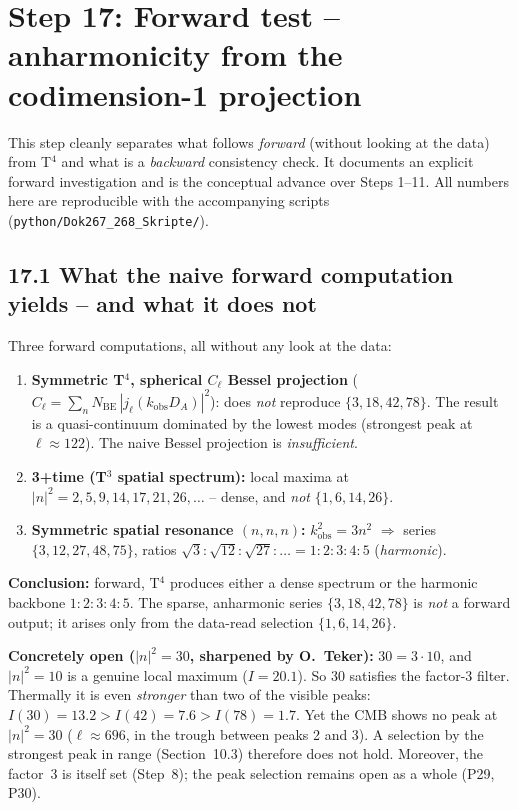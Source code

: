 \section{Step 17: Forward test -- anharmonicity from the codimension-1 projection}

This step cleanly separates what follows \emph{forward} (without looking at
the data) from T$^4$ and what is a \emph{backward} consistency check. It
documents an explicit forward investigation and is the conceptual advance over
Steps 1--11. All numbers here are reproducible with the accompanying scripts
(\texttt{python/Dok267\_268\_Skripte/}).

\subsection*{17.1 What the naive forward computation yields -- and what it does not}

Three forward computations, all without any look at the data:

\begin{enumerate}
  \item \textbf{Symmetric T$^4$, spherical $C_\ell$ Bessel projection}
        ($C_\ell = \sum_n N_\mathrm{BE}\,|j_\ell(k_\mathrm{obs}D_A)|^2$):
        does \emph{not} reproduce $\{3,18,42,78\}$. The result is a
        quasi-continuum dominated by the lowest modes (strongest peak at
        $\ell\approx122$). The naive Bessel projection is \emph{insufficient}.
  \item \textbf{3+time (T$^3$ spatial spectrum):} local maxima at
        $|n|^2=2,5,9,14,17,21,26,\ldots$ -- dense, and \emph{not}
        $\{1,6,14,26\}$.
  \item \textbf{Symmetric spatial resonance $(n,n,n)$:} $k^2_\mathrm{obs}=3n^2$
        $\Rightarrow$ series $\{3,12,27,48,75\}$, ratios
        $\sqrt{3}:\sqrt{12}:\sqrt{27}:\ldots = 1:2:3:4:5$ (\emph{harmonic}).
\end{enumerate}

\textbf{Conclusion:} forward, T$^4$ produces either a dense spectrum or the
harmonic backbone $1:2:3:4:5$. The sparse, anharmonic series $\{3,18,42,78\}$
is \emph{not} a forward output; it arises only from the data-read selection
$\{1,6,14,26\}$.

\textbf{Concretely open ($|n|^2=30$, sharpened by O.~Teker):} $30=3\cdot10$,
and $|n|^2=10$ is a genuine local maximum ($I=20.1$). So $30$ satisfies the
factor-3 filter. Thermally it is even \emph{stronger} than two of the visible
peaks: $I(30)=13.2 > I(42)=7.6 > I(78)=1.7$. Yet the CMB shows no peak at
$|n|^2=30$ ($\ell\approx696$, in the trough between peaks 2 and 3). A
selection by the strongest peak in range (Section~10.3) therefore does not
hold. Moreover, the factor~3 is itself set (Step~8); the peak selection
remains open as a whole (P29, P30).


